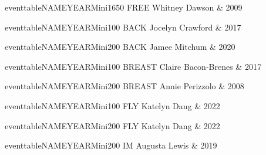 \vspace{0.3cm}

\begin{minipage}[t]{0.44\textwidth}
\centering
eventtableNAMEYEARMini{1650 FREE}{
Whitney Dawson & 2009 \\
}
\end{minipage}\hfill
\begin{minipage}[t]{0.44\textwidth}
\centering
eventtableNAMEYEARMini{100 BACK}{
Jocelyn Crawford & 2017 \\
}
\end{minipage}

\vspace{0.3cm}

\begin{minipage}[t]{0.44\textwidth}
\centering
eventtableNAMEYEARMini{200 BACK}{
Jamee Mitchum & 2020 \\
}
\end{minipage}\hfill
\begin{minipage}[t]{0.44\textwidth}
\centering
eventtableNAMEYEARMini{100 BREAST}{
Claire Bacon-Brenes & 2017 \\
}
\end{minipage}

\vspace{0.3cm}

\begin{minipage}[t]{0.44\textwidth}
\centering
eventtableNAMEYEARMini{200 BREAST}{
Annie Perizzolo & 2008 \\
}
\end{minipage}\hfill
\begin{minipage}[t]{0.44\textwidth}
\centering
eventtableNAMEYEARMini{100 FLY}{
Katelyn Dang & 2022 \\
}
\end{minipage}

\vspace{0.3cm}

\begin{minipage}[t]{0.44\textwidth}
\centering
eventtableNAMEYEARMini{200 FLY}{
Katelyn Dang & 2022 \\
}
\end{minipage}\hfill
\begin{minipage}[t]{0.44\textwidth}
\centering
eventtableNAMEYEARMini{200 IM}{
Augusta Lewis & 2019 \\
}
\end{minipage}

\vspace{0.3cm}

